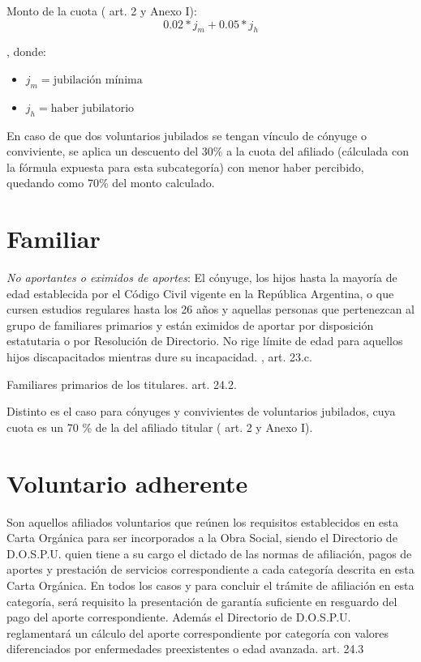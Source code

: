 Monto de la cuota (\cite{dospuRes21} art. 2 y Anexo I): $$0.02 * j_m + 0.05 * j_h$$

, donde:
\begin{itemize}
    \item $j_m = \text{jubilación mínima}$
    \item $j_h = \text{haber jubilatorio}$
\end{itemize}

En caso de que dos voluntarios jubilados se tengan vínculo de cónyuge o conviviente, se aplica un descuento del 30\% a la cuota del afiliado (cálculada con la fórmula expuesta para esta subcategoría) con menor haber percibido, quedando como 70\% del monto calculado.

\section{Familiar} \label{sec:familiar}
\begin{displayquote}
\emph{No aportantes o eximidos de aportes}: El cónyuge, los hijos hasta la mayoría de edad establecida por el Código Civil vigente en la República Argentina, o que cursen estudios regulares hasta los 26 años y aquellas personas que pertenezcan al grupo de familiares primarios y están eximidos de aportar por disposición estatutaria o por Resolución de Directorio. No rige límite de edad para aquellos hijos discapacitados mientras dure su incapacidad.
\hfill\parencite{dospuOrd53}, art. 23.c.
\end{displayquote}

\begin{displayquote}
Familiares primarios de los titulares.
\hfill\parencite{dospuOrd53} art. 24.2.
\end{displayquote}

Distinto es el caso para cónyuges y convivientes de voluntarios jubilados, cuya cuota es un 70 \% de la del afiliado titular (\cite{dospuRes21} art. 2 y Anexo I).

\section{Voluntario adherente} \label{sec:adherente}
\begin{displayquote}
Son aquellos afiliados voluntarios que reúnen los requisitos establecidos en esta Carta Orgánica para ser incorporados a la Obra Social, siendo el Directorio de D.O.S.P.U. quien tiene a su cargo el dictado de las normas de afiliación, pagos de aportes y prestación de servicios correspondiente a cada categoría descrita en esta Carta Orgánica. En todos los casos y para concluir el trámite de afiliación en esta categoría, será requisito la presentación de garantía suficiente en resguardo del pago del aporte correspondiente. Además el Directorio de D.O.S.P.U. reglamentará un cálculo del aporte correspondiente por categoría con valores diferenciados por enfermedades preexistentes o edad avanzada.
\hfill\parencite{dospuOrd53} art. 24.3
\end{displayquote}

